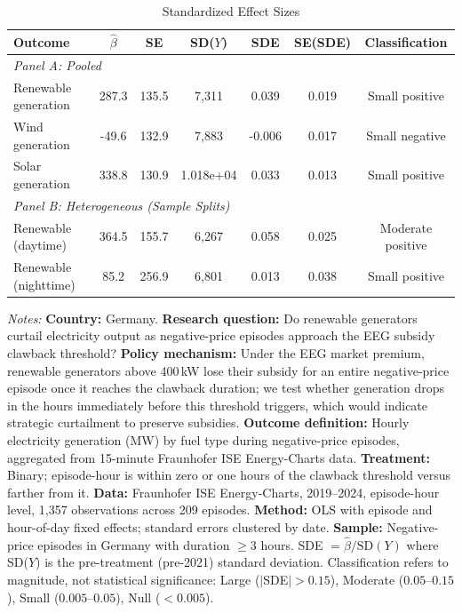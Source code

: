 \begin{table}[t]
\centering
\caption{Standardized Effect Sizes}
\label{tab:sde}
\begin{tabular}{lcccccc}
\hline\hline
Outcome & $\hat{\beta}$ & SE & SD($Y$) & SDE & SE(SDE) & Classification \\
\hline
\multicolumn{7}{l}{\textit{Panel A: Pooled}} \\
Renewable generation & 287.3 & 135.5 & 7,311 & 0.039 & 0.019 & Small positive \\
Wind generation & -49.6 & 132.9 & 7,883 & -0.006 & 0.017 & Small negative \\
Solar generation & 338.8 & 130.9 & 1.018e+04 & 0.033 & 0.013 & Small positive \\
\hline
\multicolumn{7}{l}{\textit{Panel B: Heterogeneous (Sample Splits)}} \\
Renewable (daytime) & 364.5 & 155.7 & 6,267 & 0.058 & 0.025 & Moderate positive \\
Renewable (nighttime) & 85.2 & 256.9 & 6,801 & 0.013 & 0.038 & Small positive \\
\hline\hline
\end{tabular}
\begin{tablenotes}[flushleft]
\footnotesize
\item \textit{Notes:} \textbf{Country:} Germany. \textbf{Research question:} Do renewable generators curtail electricity output as negative-price episodes approach the EEG subsidy clawback threshold? \textbf{Policy mechanism:} Under the EEG market premium, renewable generators above 400\,kW lose their subsidy for an entire negative-price episode once it reaches the clawback duration; we test whether generation drops in the hours immediately before this threshold triggers, which would indicate strategic curtailment to preserve subsidies. \textbf{Outcome definition:} Hourly electricity generation (MW) by fuel type during negative-price episodes, aggregated from 15-minute Fraunhofer ISE Energy-Charts data. \textbf{Treatment:} Binary; episode-hour is within zero or one hours of the clawback threshold versus farther from it. \textbf{Data:} Fraunhofer ISE Energy-Charts, 2019--2024, episode-hour level, 1,357 observations across 209 episodes. \textbf{Method:} OLS with episode and hour-of-day fixed effects; standard errors clustered by date. \textbf{Sample:} Negative-price episodes in Germany with duration $\geq 3$ hours. SDE $= \hat{\beta} / \text{SD}(Y)$ where SD($Y$) is the pre-treatment (pre-2021) standard deviation. Classification refers to magnitude, not statistical significance: Large ($|$SDE$| > 0.15$), Moderate ($0.05$--$0.15$), Small ($0.005$--$0.05$), Null ($< 0.005$).
\end{tablenotes}
\end{table}
